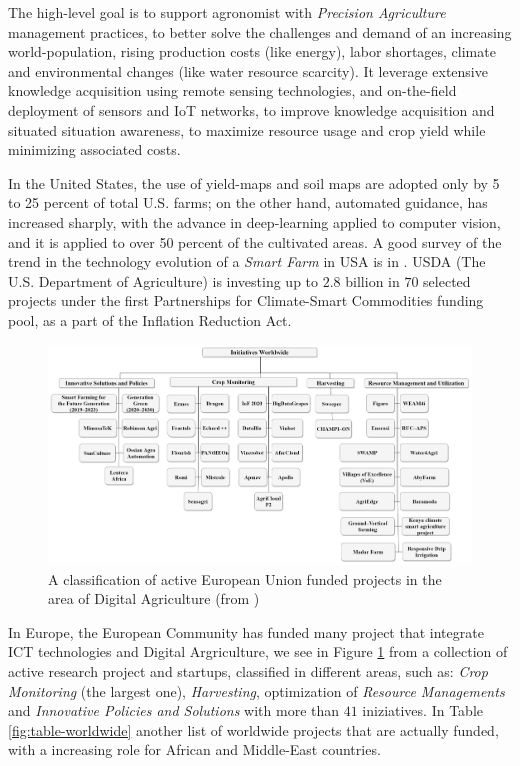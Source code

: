 \documentclass[comsoc,final]{IEEEtran}
\begin{document}
The high-level goal is to support agronomist with \emph{Precision Agriculture} management practices, to better solve the challenges and demand of an increasing world-population, rising production costs (like energy), labor shortages, climate and environmental changes (like water resource scarcity). It leverage extensive knowledge acquisition using remote sensing technologies, and on-the-field deployment of sensors and IoT networks, to improve knowledge acquisition and situated situation awareness, to maximize resource usage and crop yield while minimizing associated costs.

In the United States, the use of yield-maps and soil maps are adopted only by 5 to 25 percent of total U.S. farms; on the other hand, automated guidance, has increased sharply, with the advance in deep-learning applied to computer vision, and it is applied to over 50 percent of the cultivated areas. A good survey of the trend in the technology evolution of a \emph{Smart Farm} in USA is in \cite{mcfadden2023precision}. USDA (The U.S. Department of Agriculture) is investing up to $2.8$ billion in $70$ selected projects under the first Partnerships for Climate-Smart Commodities funding pool, as a part of the Inflation Reduction Act.


\begin{figure}
    \centering
    \includegraphics[width=\columnwidth]{agriengineering-04-00029-g005}
    \caption{A classification of active European Union funded projects in the area of Digital Agriculture (from \cite{agriengineering4020029})}
    \label{fig:euprojects}
\end{figure}

In Europe, the European Community has funded many project that integrate ICT technologies and Digital Argriculture, we see in Figure \ref{fig:euprojects} from \cite{agriengineering4020029} a collection of active research project and startups, classified in different areas, such as:  \emph{Crop Monitoring}  (the largest one), \emph{Harvesting}, optimization of \emph{Resource Managements} and \emph{Innovative Policies and Solutions} with more than $41$ iniziatives. In Table \ref{fig:table-worldwide} another list of worldwide projects that are actually funded, with a increasing role for African and Middle-East countries.
\end{document}

